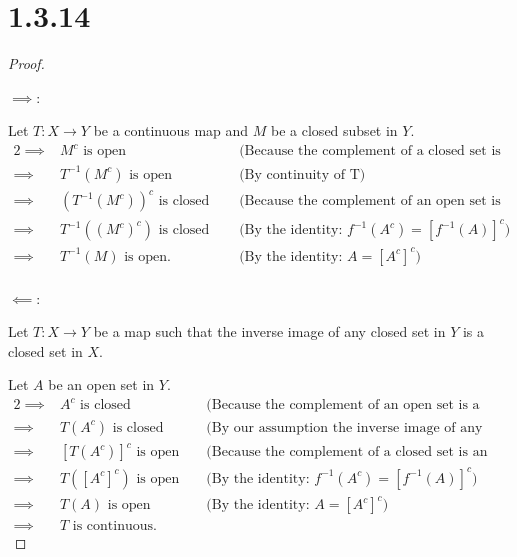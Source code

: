 \documentclass{article}
\begin{document}
\section*{1.3.14}
\begin{proof}
  $ $
  
  \underline{$\implies$}:

  Let $T: X \longrightarrow Y$ be a continuous map and $M$ be a closed subset in $Y$.
  \begin{alignat*}{2}
    \implies& M^c \text{ is open} \quad &&\text{(Because the complement of a closed set is an open set by definition 1.3-2)} \\
    \implies& T^{-1}(M^c) \text{ is open } \quad &&\text{(By continuity of T)} \\
    \implies& (T^{-1}(M^c))^c \text{ is closed } \quad &&\text{(Because the complement of an open set is a closed set by definition 1.3-2)} \\
    \implies& T^{-1}((M^c)^c) \text{ is closed } \quad &&\text{(By the identity: } f^{-1}(A^c) = [f^{-1}(A)]^c \text{)} \\
    \implies& T^{-1}(M) \text{ is open.} \quad &&\text{(By the identity: } A = [A^c]^c \text{)}\\
  \end{alignat*}

  \underline{$\impliedby$}:

  Let $T: X \longrightarrow Y$ be a map such that the inverse image of any closed set in $Y$ is a closed set in $X$.
  
  Let $A$ be an open set in $Y$.
  \begin{alignat*}{2}
    \implies& A^c \text{ is closed} \quad &&\text{(Because the complement of an open set is a closed set by definition 1.3-2)} \\
    \implies& T(A^c) \text{ is closed} \quad &&\text{(By our assumption the inverse image of any closed set is a closed set)} \\
    \implies& [T(A^c)]^c \text{ is open} \quad &&\text{(Because the complement of a closed set is an open set by definition 1.3-2)} \\
    \implies& T([A^c]^c) \text{ is open} \quad &&\text{(By the identity: } f^{-1}(A^c) = [f^{-1}(A)]^c \text{)} \\
    \implies& T(A) \text{ is open} \quad &&\text{(By the identity: } A = [A^c]^c \text{)} \\
    \implies& T \text{ is continuous.}
  \end{alignat*}

\end{proof}
\end{document}
